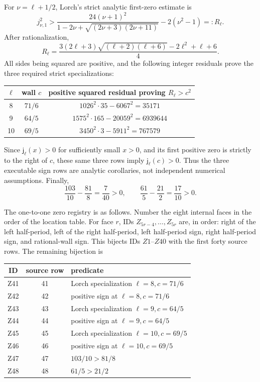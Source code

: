 \documentclass[11pt]{article}
\begin{document}
For \(\nu=\ell+1/2\), Lorch's strict analytic first-zero estimate is
\[
 j_{\nu,1}^2>
 \frac{24(\nu+1)^2}{1-2\nu+\sqrt{(2\nu+3)(2\nu+11)}}
 -2(\nu^2-1)=:R_\ell.
\]
After rationalization,
\[
 R_\ell=\frac{3(2\ell+3)\sqrt{(\ell+2)(\ell+6)}
 -2\ell^2+\ell+6}{4}.
\]
All sides being squared are positive, and the following integer residuals
prove the three required strict specializations:
\begin{center}
\begin{tabular}{c|c|c}
\toprule
\(\ell\)&wall \(c\)&positive squared residual proving \(R_\ell>c^2\)\\
\midrule
8&\(71/6\)&\(1026^2\cdot35-6067^2=35171\)\\
9&\(64/5\)&\(1575^2\cdot165-20059^2=6939644\)\\
10&\(69/5\)&\(3450^2\cdot3-5911^2=767579\)\\
\bottomrule
\end{tabular}
\end{center}
Since \(\mathsf j_\ell(x)>0\) for sufficiently small \(x>0\), and its
first positive zero is strictly to the right of \(c\), these same three
rows imply \(\mathsf j_\ell(c)>0\).  Thus the three executable sign rows
are analytic corollaries, not independent numerical assumptions.  Finally,
\[
 \frac{103}{10}-\frac{81}{8}=\frac7{40}>0,
 \qquad
 \frac{61}{5}-\frac{21}{2}=\frac{17}{10}>0.
\]

The one-to-one zero registry is as follows.  Number the eight internal
faces in the order of the location table.  For face \(r\), IDs
\(Z_{5r-4},\ldots,Z_{5r}\) are, in order: right of the left half-period,
left of the right half-period, left half-period sign, right half-period
sign, and rational-wall sign.  This bijects IDs \(Z1\)--\(Z40\) with the
first forty source rows.  The remaining bijection is
\begin{center}
\small
\begin{tabular}{c|c|l}
\toprule
ID&source row&predicate\\
\midrule
Z41&41&Lorch specialization \(\ell=8,c=71/6\)\\
Z42&42&positive sign at \(\ell=8,c=71/6\)\\
Z43&43&Lorch specialization \(\ell=9,c=64/5\)\\
Z44&44&positive sign at \(\ell=9,c=64/5\)\\
Z45&45&Lorch specialization \(\ell=10,c=69/5\)\\
Z46&46&positive sign at \(\ell=10,c=69/5\)\\
Z47&47&\(103/10>81/8\)\\
Z48&48&\(61/5>21/2\)\\
\bottomrule
\end{tabular}
\end{center}
\end{document}
